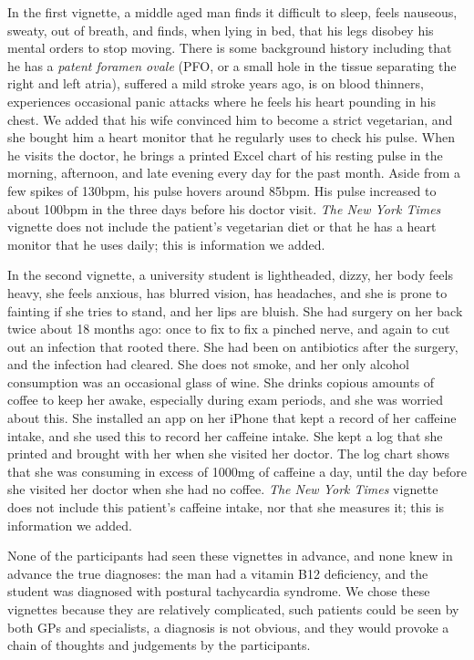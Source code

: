 \documentclass{sigchi}
\begin{document}
In the first vignette, a middle aged man finds it difficult to sleep, feels nauseous, sweaty, out of breath, and finds, when lying in bed, that his legs disobey his mental orders to stop moving.   There is some background history including that he has a \emph{patent foramen ovale} (PFO, or a small hole in the tissue separating the right and left atria), suffered a mild stroke years ago, is on blood thinners, experiences occasional panic attacks where he feels his heart pounding in his chest.  We added that his wife convinced him to become a strict vegetarian, and she bought him a heart monitor that he regularly uses to check his pulse. When he visits the doctor, he brings a printed Excel chart of his resting pulse in the morning, afternoon, and late evening every day for the past month. Aside from a few spikes of 130bpm, his pulse hovers around 85bpm.  His pulse increased to about 100bpm in the three days before his doctor visit.  \emph{The New York Times} vignette does not include the patient's vegetarian diet or that he has a heart monitor that he uses daily; this is information we added.

In the second vignette, a university student is lightheaded, dizzy, her body feels heavy, she feels anxious, has blurred vision, has headaches, and she is prone to fainting if she tries to stand, and her lips are bluish. She had surgery on her back twice about 18 months ago: once to fix to fix a pinched nerve, and again to cut out an infection that rooted there.  She had been on antibiotics after the surgery, and the infection had cleared.  She does not smoke, and her only alcohol consumption was an occasional glass of wine.  She drinks copious amounts of coffee to keep her awake, especially during exam periods, and she was worried about this.  She installed an app on her iPhone that kept a record of her caffeine intake, and she used this to record her caffeine intake. She kept a log that she printed and brought with her when she visited her doctor. The log chart shows that she was consuming in excess of 1000mg of caffeine a day, until the day before she visited her doctor when she had no coffee.  \emph{The New York Times} vignette does not include this patient's caffeine intake, nor that she measures it; this is information we added.

None of the participants had seen these vignettes in advance, and none knew in advance the true diagnoses: the man had a vitamin B12 deficiency, and the student was diagnosed with postural tachycardia syndrome.  We chose these vignettes because they are relatively complicated, such patients could be seen by both GPs and specialists, a diagnosis is not obvious, and they would provoke a chain of thoughts and judgements by the participants.
\end{document}
